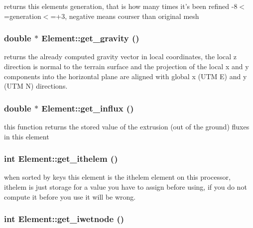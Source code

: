 returns this elements generation, that is how many times it's been refined -8$<$=generation$<$=+3, negative means courser than original mesh 

\hypertarget{classElement_a87}{
\subsubsection[get\_\-gravity]{\setlength{\rightskip}{0pt plus 5cm}double $\ast$ Element::get\_\-gravity ()}}
\label{classElement_a87}


returns the already computed gravity vector in local coordinates, the local z direction is normal to the terrain surface and the projection of the local x and y components into the horizontal plane are aligned with global x (UTM E) and y (UTM N) directions. 

\hypertarget{classElement_a109}{
\subsubsection[get\_\-influx]{\setlength{\rightskip}{0pt plus 5cm}double $\ast$ Element::get\_\-influx ()}}
\label{classElement_a109}


this function returns the stored value of the extrusion (out of the ground) fluxes in this element 

\hypertarget{classElement_a117}{
\subsubsection[get\_\-ithelem]{\setlength{\rightskip}{0pt plus 5cm}int Element::get\_\-ithelem ()}}
\label{classElement_a117}


when sorted by keys this element is the ithelem element on this processor, ithelem is just storage for a value you have to assign before using, if you do not compute it before you use it will be wrong. 

\hypertarget{classElement_a125}{
\subsubsection[get\_\-iwetnode]{\setlength{\rightskip}{0pt plus 5cm}int Element::get\_\-iwetnode ()}}
\label{classElement_a125}


